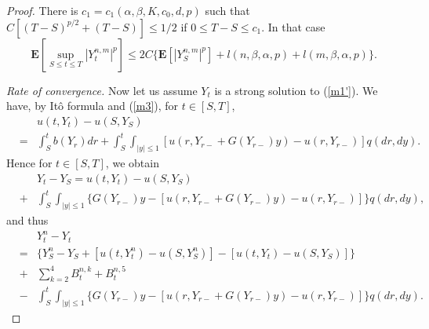 \documentclass[11pt]{amsart}
\theoremstyle{plain}
\numberwithin{equation}{section}
\begin{document}
\begin{proof}
There is $c_{1}=c_{1}\left( \alpha ,\beta ,K,c_{0},d,p\right) $ such that $C\left[ \left( T-S\right) ^{p/2}+\left( T-S\right) \right] \leq 1/2$ if $0\leq T-S\leq c_{1}$. In that case\begin{equation*}
\mathbf{E}\left[ \sup_{S\leq t\leq T}\left\vert Y_{t}^{n,m}\right\vert ^{p}\right] \leq 2C\Big\{\mathbf{E}\left[ \left\vert Y_{S}^{n,m}\right\vert ^{p}\right] +l\left( n,\beta ,\alpha ,p\right) +l\left( m,\beta ,\alpha
,p\right) \Big\}.
\end{equation*}

\emph{Rate of convergence. }Now let us assume $Y_{t}$ is a strong solution
to (\ref{m1'}). We have, by It\^{o} formula and (\ref{m3}), for $t\in \left[
S,T\right] $, 
\begin{eqnarray*}
&&u\left( t,Y_{t}\right) -u\left( S,Y_{S}\right) \\
&=&\int_{S}^{t}b\left( Y_{r}\right) dr+\int_{S}^{t}\int_{\left\vert
y\right\vert \leq 1}\left[ u\left( r,Y_{r-}+G\left( Y_{r-}\right) y\right)
-u\left( r,Y_{r-}\right) \right] q\left( dr,dy\right) .
\end{eqnarray*}Hence for $t\in \left[ S,T\right] $, we obtain 
\begin{eqnarray*}
&&Y_{t}-Y_{S}=u\left( t,Y_{t}\right) -u\left( S,Y_{S}\right) \\
&+&\int_{S}^{t}\int_{\left\vert y\right\vert \leq 1}\{G\left( Y_{r-}\right)
y-\left[ u\left( r,Y_{r-}+G\left( Y_{r-}\right) y\right) -u\left(
r,Y_{r-}\right) \right] \}q\left( dr,dy\right) ,
\end{eqnarray*}
and thus 
\begin{eqnarray*}
&&Y_{t}^{n}-Y_{t} \\
&=&\{Y_{S}^{n}-Y_{S}+[u\left( t,Y_{t}^{n}\right) -u\left( S,Y_{S}^{n}\right)
]-[u\left( t,Y_{t}\right) -u\left( S,Y_{S}\right) ]\} \\
&+&\sum_{k=2}^{4}B_{t}^{n,k}+B_{t}^{n,5} \\
&-&\int_{S}^{t}\int_{\left\vert y\right\vert \leq 1}\{G\left( Y_{r-}\right)
y-\left[ u\left( r,Y_{r-}+G\left( Y_{r-}\right) y\right) -u\left(
r,Y_{r-}\right) \right] \}q\left( dr,dy\right) .
\end{eqnarray*}


\end{proof}
\end{document}
